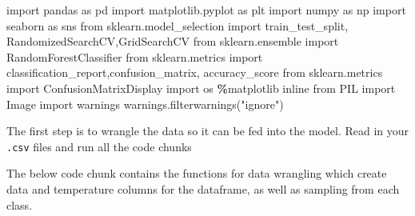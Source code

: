 \documentclass[
]{article}
\newenvironment{Shaded}{\begin{snugshade}}{\end{snugshade}}
\newcommand{\ImportTok}[1]{#1}
\newcommand{\NormalTok}[1]{#1}
\newcommand{\OperatorTok}[1]{\textcolor[rgb]{0.81,0.36,0.00}{\textbf{#1}}}
\newcommand{\StringTok}[1]{\textcolor[rgb]{0.31,0.60,0.02}{#1}}
\begin{document}
\begin{Shaded}
\begin{Highlighting}[]
\ImportTok{import}\NormalTok{ pandas }\ImportTok{as}\NormalTok{ pd}
\ImportTok{import}\NormalTok{ matplotlib.pyplot }\ImportTok{as}\NormalTok{ plt}
\ImportTok{import}\NormalTok{ numpy }\ImportTok{as}\NormalTok{ np}
\ImportTok{import}\NormalTok{ seaborn }\ImportTok{as}\NormalTok{ sns}
\ImportTok{from}\NormalTok{ sklearn.model\_selection }\ImportTok{import}\NormalTok{ train\_test\_split, RandomizedSearchCV,GridSearchCV}
\ImportTok{from}\NormalTok{ sklearn.ensemble }\ImportTok{import}\NormalTok{ RandomForestClassifier}
\ImportTok{from}\NormalTok{ sklearn.metrics }\ImportTok{import}\NormalTok{ classification\_report,confusion\_matrix, accuracy\_score}
\ImportTok{from}\NormalTok{ sklearn.metrics }\ImportTok{import}\NormalTok{ ConfusionMatrixDisplay}
\ImportTok{import}\NormalTok{ os}
\OperatorTok{\%}\NormalTok{matplotlib inline}
\ImportTok{from}\NormalTok{ PIL }\ImportTok{import}\NormalTok{ Image}
\ImportTok{import}\NormalTok{ warnings}
\NormalTok{warnings.filterwarnings(}\StringTok{"ignore"}\NormalTok{)}
\end{Highlighting}
\end{Shaded}

The first step is to wrangle the data so it can be fed into the model. Read in your \texttt{.csv} files and run all the code chunks

The below code chunk contains the functions for data wrangling which create data and temperature columns for the dataframe, as well as sampling from each class.
\end{document}
